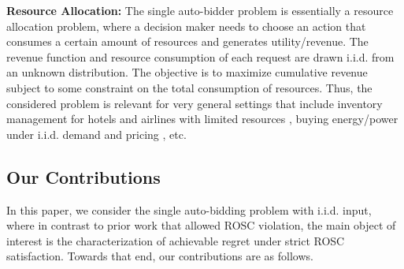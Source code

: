 {\bf Resource Allocation:} The single auto-bidder problem is essentially a resource allocation problem,
where a decision maker needs to
choose an action that consumes a certain amount
of resources and generates utility/revenue. The revenue
function and resource consumption of each request are drawn i.i.d. from an unknown distribution. 
The objective is to maximize
cumulative revenue subject to some constraint on the total consumption of resources. 
Thus, the considered problem is relevant for very general settings that include 
inventory management for hotels and airlines with limited resources \cite{talluri1998analysis}, buying energy/power under 
i.i.d. demand and pricing \cite{yang2019online}, etc.

\vspace{-.2in}
\subsection{Our Contributions}
In this paper, we consider the single auto-bidding problem with i.i.d. input, where in contrast to prior work that allowed ROSC 
violation, the main object of interest  is the characterization of achievable regret under strict ROSC satisfaction. Towards that end, our contributions are as follows.
